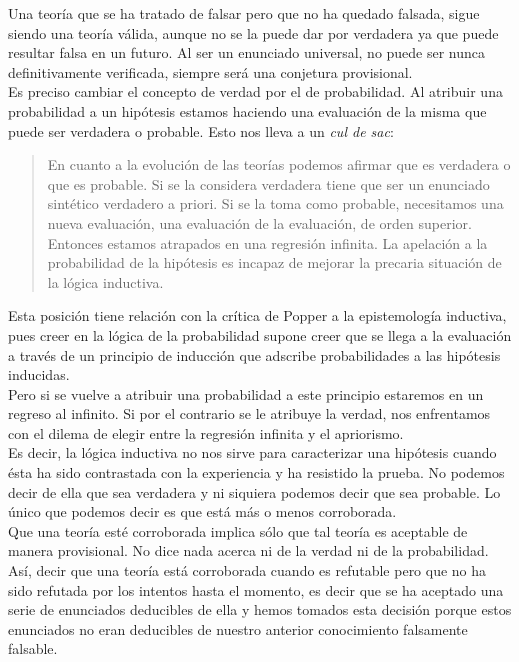 \documentclass[a4paper, 11pt, twocolumn, spanish]{article}
\begin{document}
Una teoría que se ha tratado de falsar pero que no ha quedado falsada,
sigue siendo una teoría válida, aunque no se la puede dar por
verdadera ya que puede resultar falsa en un futuro. Al ser un
enunciado universal, no puede ser nunca definitivamente verificada,
siempre será una conjetura provisional.\\[0pt]
Es preciso cambiar el concepto de verdad por el de probabilidad. Al
atribuir una probabilidad a un hipótesis estamos haciendo una
evaluación de la misma que puede ser verdadera o probable. Esto nos
lleva a un \emph{cul de sac}:

\begin{quote}
En cuanto a la evolución de las teorías podemos afirmar que es
verdadera o que es probable. Si se la considera verdadera tiene que
ser un enunciado sintético verdadero a priori. Si se la toma como
probable, necesitamos una nueva evaluación, una evaluación de la
evaluación, de orden superior. Entonces estamos atrapados en una
regresión infinita. La apelación a la probabilidad de la hipótesis es
incapaz de mejorar la precaria situación de la lógica inductiva.
\end{quote}

Esta posición tiene relación con la crítica de Popper a la
epistemología inductiva, pues creer en la lógica de la probabilidad
supone creer que se llega a la evaluación a través de un principio de
inducción que adscribe probabilidades a las hipótesis inducidas.\\[0pt]
Pero si se vuelve a atribuir una probabilidad a este principio
estaremos en un regreso al infinito. Si por el contrario se le
atribuye la verdad, nos enfrentamos con el dilema de elegir entre la
regresión infinita y el apriorismo.\\[0pt]
Es decir, la lógica inductiva no nos sirve para caracterizar una
hipótesis cuando ésta ha sido contrastada con la experiencia y ha
resistido la prueba. No podemos decir de ella que sea verdadera y ni
siquiera podemos decir que sea probable. Lo único que podemos decir es
que está más o menos corroborada.\\[0pt]

Que una teoría esté corroborada implica sólo que tal teoría es
aceptable de manera provisional. No dice nada acerca ni de la verdad
ni de la probabilidad.\\[0pt]
Así, decir que una teoría está corroborada cuando es refutable pero
que no ha sido refutada por los intentos hasta el momento, es decir
que se ha aceptado una serie de enunciados deducibles de ella y hemos
tomados esta decisión porque estos enunciados no eran deducibles de
nuestro anterior conocimiento falsamente falsable.\\[0pt]
\end{document}

